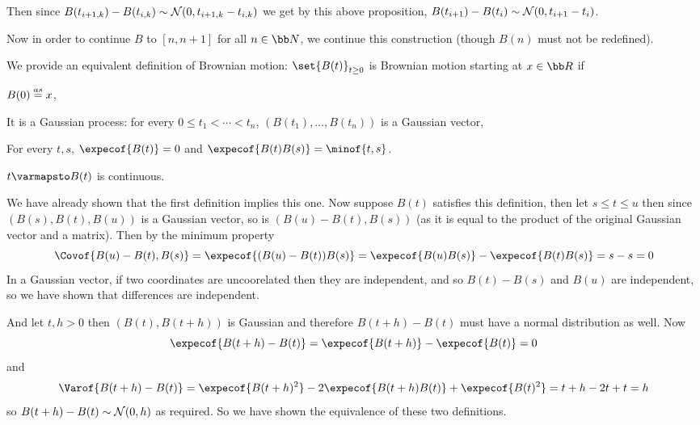 \eprop

Then since $B(t_{i+1,k})-B(t_{i,k})\sim{\cal N}(0,t_{i+1,k}-t_{i,k})$ we get by this above proposition, $B(t_{i+1})-B(t_i)\sim{\cal N}(0,t_{i+1}-t_i)$.

Now in order to continue $B$ to $[n,n+1]$ for all $n\in{\bb N}$, we continue this construction (though $B(n)$ must not be redefined).

\bdefn

    We provide an equivalent definition of Brownian motion: $\set{B(t)}_{t\geq0}$ is Brownian motion starting at $x\in{\bb R}$ if
    \benum
        \item $B(0)\buildrel as\over=x$,
        \item It is a Gaussian process: for every $0\leq t_1<\cdots<t_n$, $(B(t_1),\dots,B(t_n))$ is a Gaussian vector,
        \item For every $t,s$, $\expecof{B(t)}=0$ and $\expecof{B(t)B(s)}=\minof{t,s}$.
        \item $t\varmapsto B(t)$ is continuous.
    \eenum

\edefn

We have already shown that the first definition implies this one.
Now suppose $B(t)$ satisfies this definition, then let $s\leq t\leq u$ then since $(B(s),B(t),B(u))$ is a Gaussian vector, so is $(B(u)-B(t),B(s))$ (as it is equal to the product of the original Gaussian
vector and a matrix).
Then by the minimum property
$$ \Covof{B(u)-B(t),B(s)} = \expecof{(B(u)-B(t))B(s)} = \expecof{B(u)B(s)} - \expecof{B(t)B(s)} = s - s = 0 $$
In a Gaussian vector, if two coordinates are uncoorelated then they are independent, and so $B(t)-B(s)$ and $B(u)$ are independent, so we have shown that differences are independent.

And let $t,h>0$ then $(B(t),B(t+h))$ is Gaussian and therefore $B(t+h)-B(t)$ must have a normal distribution as well.
Now
$$ \expecof{B(t+h) - B(t)} = \expecof{B(t+h)} - \expecof{B(t)} = 0 $$
and
$$ \Varof{B(t+h) - B(t)} = \expecof{B(t+h)^2} - 2\expecof{B(t+h)B(t)} + \expecof{B(t)^2} = t+h - 2t + t = h $$
so $B(t+h)-B(t)\sim{\cal N}(0,h)$ as required.
So we have shown the equivalence of these two definitions.

\bye


